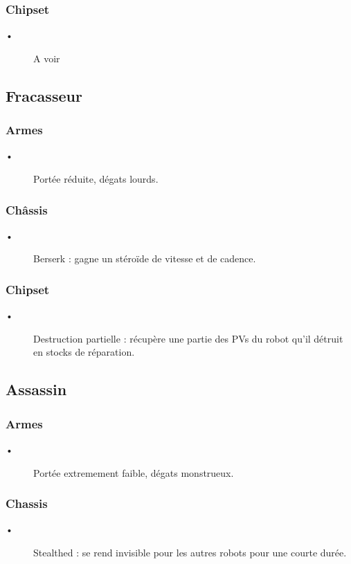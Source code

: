 \documentclass[10pt]{article}
\begin{document}
\subsubsection*{Chipset}
\begin{description}
\item [•]A voir
\end{description}

\subsection{Fracasseur}
\subsubsection*{Armes}
\begin{description}
\item [•] Portée réduite, dégats lourds.
\end{description}

\subsubsection*{Châssis}
\begin{description}
\item [•] Berserk : gagne un stéroïde de vitesse et de cadence.
\end{description}

\subsubsection*{Chipset}
\begin{description}
\item [•] Destruction partielle : récupère une partie des PVs du robot qu'il détruit en stocks de réparation.
\end{description}

\subsection{Assassin}
\subsubsection*{Armes}
\begin{description}
\item [•] Portée extremement faible, dégats monstrueux.
\end{description}

\subsubsection*{Chassis}
\begin{description}
\item [•] Stealthed : se rend invisible pour les autres robots pour une courte durée. 
\end{description}
\end{document}

